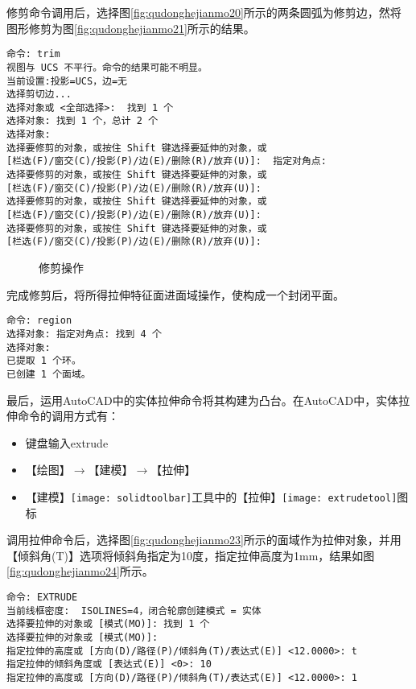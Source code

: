\begin{procedure}
修剪命令调用后，选择图\ref{fig:qudonghejianmo20}所示的两条圆弧为修剪边，然将图形修剪为图\ref{fig:qudonghejianmo21}所示的结果。

\begin{lstlisting}
命令: trim
视图与 UCS 不平行。命令的结果可能不明显。
当前设置:投影=UCS，边=无
选择剪切边...
选择对象或 <全部选择>:  找到 1 个
选择对象: 找到 1 个，总计 2 个
选择对象:
选择要修剪的对象，或按住 Shift 键选择要延伸的对象，或
[栏选(F)/窗交(C)/投影(P)/边(E)/删除(R)/放弃(U)]:  指定对角点:
选择要修剪的对象，或按住 Shift 键选择要延伸的对象，或
[栏选(F)/窗交(C)/投影(P)/边(E)/删除(R)/放弃(U)]:
选择要修剪的对象，或按住 Shift 键选择要延伸的对象，或
[栏选(F)/窗交(C)/投影(P)/边(E)/删除(R)/放弃(U)]:
选择要修剪的对象，或按住 Shift 键选择要延伸的对象，或
[栏选(F)/窗交(C)/投影(P)/边(E)/删除(R)/放弃(U)]:
\end{lstlisting}

\begin{figure}[htbp]
\centering
{}\hspace{60pt}
\caption{修剪操作}
\end{figure}

完成修剪后，将所得拉伸特征面进面域操作，使构成一个封闭平面。

\begin{lstlisting}
命令: region
选择对象: 指定对角点: 找到 4 个
选择对象:
已提取 1 个环。
已创建 1 个面域。
\end{lstlisting}

最后，运用AutoCAD中的实体拉伸命令将其构建为凸台。在AutoCAD中，实体拉伸命令的调用方式有：
\begin{itemize}
	\item 键盘输入extrude
	\item 【绘图】$\rightarrow$【建模】$\rightarrow$【拉伸】
	\item 【建模】\texttt{[image: solidtoolbar]}工具中的【拉伸】\texttt{[image: extrudetool]}图标	
\end{itemize}

调用拉伸命令后，选择图\ref{fig:qudonghejianmo23}所示的面域作为拉伸对象，并用【倾斜角(T)】选项将倾斜角指定为10度，指定拉伸高度为1mm，结果如图\ref{fig:qudonghejianmo24}所示。
\begin{lstlisting}
命令: EXTRUDE
当前线框密度:  ISOLINES=4，闭合轮廓创建模式 = 实体
选择要拉伸的对象或 [模式(MO)]: 找到 1 个
选择要拉伸的对象或 [模式(MO)]:
指定拉伸的高度或 [方向(D)/路径(P)/倾斜角(T)/表达式(E)] <12.0000>: t
指定拉伸的倾斜角度或 [表达式(E)] <0>: 10
指定拉伸的高度或 [方向(D)/路径(P)/倾斜角(T)/表达式(E)] <12.0000>: 1
\end{lstlisting}


\end{procedure}
